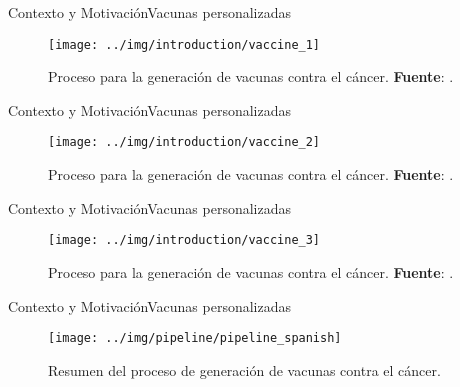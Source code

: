 \documentclass[10pt]{beamer}
\newcommand{\1}{
	\setbeamertemplate{background}{
		\texttt{[image: img/1]}
		\tikz[overlay] \fill[fill opacity=0.75,fill=white] (0,0) rectangle (-\paperwidth,\paperheight);
	}
}
\begin{document}
\begin{frame}{Contexto y Motivación}{Vacunas personalizadas}	
	\begin{figure}[]
		\centering
		\texttt{[image: ../img/introduction/vaccine\_1]}
		\caption{Proceso para la generación de vacunas contra el cáncer. \textbf{Fuente}: \cite{ucir2023}.}
	\end{figure}
\end{frame}



\begin{frame}{Contexto y Motivación}{Vacunas personalizadas}	
	\begin{figure}[]
		\centering
		\texttt{[image: ../img/introduction/vaccine\_2]}
		\caption{Proceso para la generación de vacunas contra el cáncer. \textbf{Fuente}: \cite{ucir2023}.}
	\end{figure}
\end{frame}

\begin{frame}{Contexto y Motivación}{Vacunas personalizadas}	
	\begin{figure}[]
		\centering
		\texttt{[image: ../img/introduction/vaccine\_3]}
		\caption{Proceso para la generación de vacunas contra el cáncer. \textbf{Fuente}: \cite{ucir2023}.}
	\end{figure}
\end{frame}

\begin{frame}{Contexto y Motivación}{Vacunas personalizadas}
	\begin{figure}
		\texttt{[image: ../img/pipeline/pipeline\_spanish]}
		\caption{Resumen del proceso de  generación de vacunas contra el cáncer.}
	\end{figure}		
\end{frame}
\end{document}
